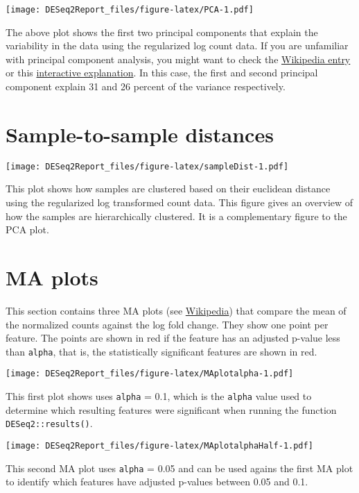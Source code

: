 \documentclass[]{article}
\begin{document}
\texttt{[image: DESeq2Report\_files/figure-latex/PCA-1.pdf]}

The above plot shows the first two principal components that explain the
variability in the data using the regularized log count data. If you are
unfamiliar with principal component analysis, you might want to check
the
\href{https://en.wikipedia.org/wiki/Principal_component_analysis}{Wikipedia
entry} or this
\href{http://setosa.io/ev/principal-component-analysis/}{interactive
explanation}. In this case, the first and second principal component
explain 31 and 26 percent of the variance respectively.

\section{Sample-to-sample distances}\label{sample-to-sample-distances}

\texttt{[image: DESeq2Report\_files/figure-latex/sampleDist-1.pdf]}

This plot shows how samples are clustered based on their euclidean
distance using the regularized log transformed count data. This figure
gives an overview of how the samples are hierarchically clustered. It is
a complementary figure to the PCA plot.

\section{MA plots}\label{ma-plots}

This section contains three MA plots (see
\href{https://en.wikipedia.org/wiki/MA_plot}{Wikipedia}) that compare
the mean of the normalized counts against the log fold change. They show
one point per feature. The points are shown in red if the feature has an
adjusted p-value less than \texttt{alpha}, that is, the statistically
significant features are shown in red.

\texttt{[image: DESeq2Report\_files/figure-latex/MAplotalpha-1.pdf]}

This first plot shows uses \texttt{alpha} = 0.1, which is the
\texttt{alpha} value used to determine which resulting features were
significant when running the function \texttt{DESeq2::results()}.

\texttt{[image: DESeq2Report\_files/figure-latex/MAplotalphaHalf-1.pdf]}

This second MA plot uses \texttt{alpha} = 0.05 and can be used agains
the first MA plot to identify which features have adjusted p-values
between 0.05 and 0.1.
\end{document}
